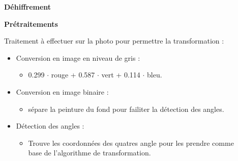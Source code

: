 \documentclass{beamer}
\begin{document}
\begin{frame}[t]
\begin{columns}[t]
\begin{column}{.5\linewidth}
                \vspace{1em}
            \end{column}


            \begin{column}{.5\linewidth}
                \begin{center}
                    {\textbf{Déhiffrement}}
                \end{center}


                \begin{block}{\centering \textbf{Prétraitements}}
                    \vspace{.5em}

                    Traitement à effectuer sur la photo pour permettre la transformation :
                    \begin{itemize}[label=\textbullet]
                        \item Conversion en image en niveau de gris :
                        \begin{itemize}[label=$\rightarrow$]
                            \item 0.299 $\cdot$ rouge + 0.587 $\cdot$ vert + 0.114 $\cdot$ bleu.
                        \end{itemize}
                        \item Conversion en image binaire :
                        \begin{itemize}[label=$\rightarrow$]
                            \item sépare la peinture du fond pour failiter la détection des angles.
                        \end{itemize}
                        \item Détection des angles :
                        \begin{itemize}[label=$\rightarrow$]
                            \item Trouve les coordonnées des quatres angle pour les prendre comme base de l'algorithme de transformation.
                        \end{itemize}
                    \end{itemize}
                \end{block}


\end{column}
\end{columns}
\end{frame}
\end{document}
